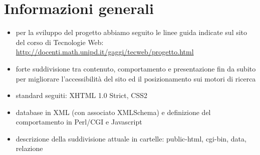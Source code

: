 \documentclass[../relazione.tex]{subfiles}
\begin{document}
\section{Informazioni generali}
	\begin{itemize}
		\item per la sviluppo del progetto abbiamo seguito le linee guida indicate sul sito del corso di Tecnologie Web: \url{http://docenti.math.unipd.it/gaggi/tecweb/progetto.html}
		\item forte suddivisione tra contenuto, comportamento e presentazione fin da subito per migliorare l'accessibilità del sito ed il posizionamento sui motori di ricerca
		\item standard seguiti: XHTML 1.0 Strict, CSS2
		\item database in XML (con associato XMLSchema) e definizione del comportamento in Perl/CGI e Javascript
		\item descrizione della suddivisione attuale in cartelle: public-html, cgi-bin, data, relazione
	\end{itemize}
\end{document}
